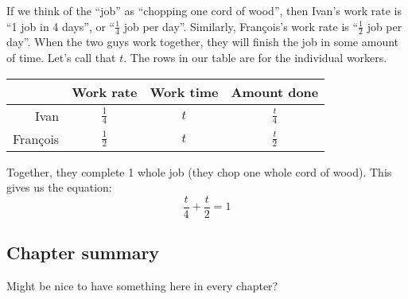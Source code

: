If we think of the ``job'' as ``chopping one cord of wood'', then Ivan's work rate is ``1 job in 4 days'', or ``$\frac{1}{4}$ job per day''. Similarly, Fran\c{c}ois's work rate is ``$\frac{1}{2}$ job per day''. When the two guys work together, they will finish the job in some amount of time. Let's call that $t$. The rows in our table are for the individual workers.

\begin{center}
\begin{tabular}{r|ccc}
				& Work rate				& Work time			& Amount done\\\hline
Ivan				& $\frac{1}{4}$			& $t$					& $\frac{t}{4}$\\
Fran\c{c}ois		& $\frac{1}{2}$			& $t$					& $\frac{t}{2}$\\
\end{tabular}
\end{center}

Together, they complete 1 whole job (they chop one whole cord of wood). This gives us the equation:
\[
\frac{t}{4} + \frac{t}{2} = 1
\]

\subsection*{Chapter summary}

Might be nice to have something here in every chapter?
